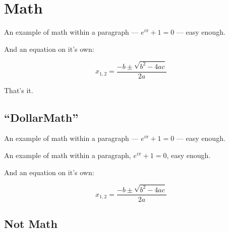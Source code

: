 
\def\mytitle{MultiMarkdown Math Example}


\part{Math}
\label{math}

An example of math within a paragraph --- ${e}^{i\pi }+1=0$ --- easy
enough.

And an equation on it's own:

\[ {x}_{1,2}=\frac{-b\pm \sqrt{{b}^{2}-4ac}}{2a} \]

That's it.

\chapter{``DollarMath''}
\label{dollarmath}

An example of math within a paragraph --- ${e}^{i\pi }+1=0$ --- easy
enough.

An example of math within a paragraph, ${e}^{i\pi }+1=0$, easy
enough.

And an equation on it's own:

$${x}_{1,2}=\frac{-b\pm \sqrt{{b}^{2}-4ac}}{2a}$$

\chapter{Not Math}
\label{notmath}


